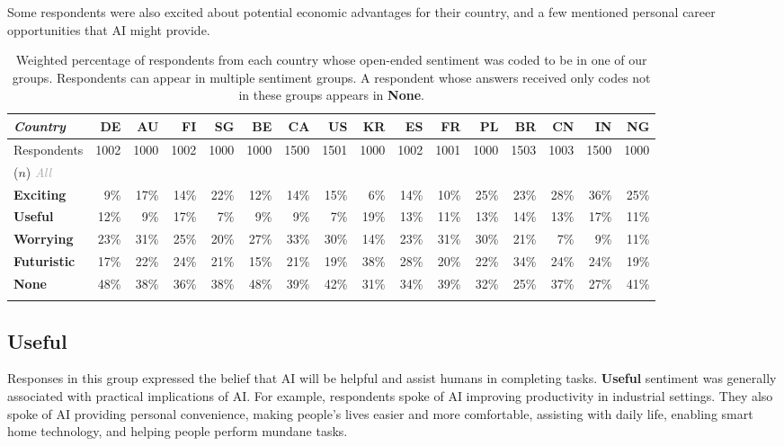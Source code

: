 \documentclass[11pt]{article} %
\newcommand\gray[1]{\textcolor{darkgray}{#1}}
\def\Exciting/{{\fontfamily{lmss}\selectfont\textbf{Exciting}}}  \def\Useful/{{\fontfamily{lmss}\selectfont\textbf{Useful}}}
\def\Worrying/{{\fontfamily{lmss}\selectfont\textbf{Worrying}}}
\def\Futuristic/{{\fontfamily{lmss}\selectfont\textbf{Futuristic}}}
\def\None/{{\fontfamily{lmss}\selectfont\textbf{None}}}
\begin{document}
Some respondents were also excited about potential economic advantages for their country, and a few mentioned personal career opportunities that AI might provide.


\begin{table}[t]\centering
\footnotesize
\begin{tabular}{@{}l@{\hskip 0.3cm}rrrrrrrrrrrrrrr@{}}

\emph{Country} & \bf DE & \bf AU & \bf FI & \bf SG & \bf BE & \bf CA & \bf US & \bf KR & \bf ES & \bf FR & \bf PL & \bf BR & \bf CN & \bf IN & \bf NG \\

\midrule
Respondents  & 1002 & 1000 & 1002 & 1000 & 1000 & 1500 & 1501 & 1000 & 1002 & 1001 & 1000 & 1503 & 1003 & 1500 & 1000 \\
($n$) \gray{\emph{All}} \\
\midrule
\Exciting/ &     9\% & 17\% & 14\% & 22\% & 12\% & 14\% & 15\% &  6\% & 14\% & 10\% & 25\% & 23\% & 28\% & 36\% & 25\% \\
\Useful/ &      12\% &  9\% & 17\% &  7\% &  9\% &  9\% &  7\% & 19\% & 13\% & 11\% & 13\% & 14\% & 13\% & 17\% & 11\% \\
\Worrying/ &    23\% & 31\% & 25\% & 20\% & 27\% & 33\% & 30\% & 14\% & 23\% & 31\% & 30\% & 21\% &  7\% & 9\% &  11\% \\
\Futuristic/ &  17\% & 22\% & 24\% & 21\% & 15\% & 21\% & 19\% & 38\% & 28\% & 20\% & 22\% & 34\% & 24\% & 24\% & 19\% \\
\None/ &        48\% & 38\% & 36\% & 38\% & 48\% & 39\% & 42\% & 31\% & 34\% & 39\% & 32\% & 25\% & 37\% & 27\% & 41\% \\

\bottomrule
\vspace{0.01cm}

\end{tabular}
\caption{Weighted percentage of respondents from each country whose open-ended sentiment was coded to be in one of our groups. Respondents can appear in multiple sentiment groups. A respondent whose answers received only codes not in these groups appears in \None/.}
\label{tab:sentimentgroups}

\end{table}



\subsection{Useful}
Responses in this group expressed the belief that AI will be helpful and assist humans in completing tasks. \Useful/ sentiment was generally associated with practical implications of AI. For example, respondents spoke of AI improving productivity in industrial settings. They also spoke of AI providing personal convenience, making people's lives easier and more comfortable, assisting with daily life, enabling smart home technology, and helping people perform mundane tasks.
\end{document}
